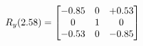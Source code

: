 \documentclass[preview]{standalone}
\begin{document}
\begin{align*}
\special{dvisvgm:raw <g id='unique000'>}R_{y}(2.58) = \begin{bmatrix}-0.85 & 0 & +0.53 \\0 & 1 & 0 \\-0.53 & 0 & -0.85\end{bmatrix}\special{dvisvgm:raw </g>}
\end{align*}
\end{document}
